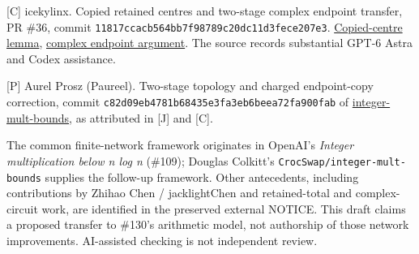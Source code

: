 \documentclass[
  11pt,
]{article}
\begin{document}
{[}C{]} icekylinx. Copied retained centres and two-stage complex
endpoint transfer, PR \#36, commit
\texttt{11817ccacb564bb7f98789c20dc11d3fece207e3}.
\href{https://github.com/icekylinx/integer-mult-bounds/blob/11817ccacb564bb7f98789c20dc11d3fece207e3/notes/copied-centers-lemma.tex}{Copied-centre
lemma},
\href{https://github.com/icekylinx/integer-mult-bounds/blob/11817ccacb564bb7f98789c20dc11d3fece207e3/notes/copied-centers-complex.tex}{complex
endpoint argument}. The source records substantial GPT-6 Astra and Codex
assistance.

{[}P{]} Aurel Prosz (Paureel). Two-stage topology and charged
endpoint-copy correction, commit
\texttt{c82d09eb4781b68435e3fa3eb6beea72fa900fab} of
\href{https://github.com/Paureel/integer-mult-bounds/tree/c82d09eb4781b68435e3fa3eb6beea72fa900fab}{integer-mult-bounds},
as attributed in {[}J{]} and {[}C{]}.

The common finite-network framework originates in OpenAI's \emph{Integer
multiplication below n log n} (\#109); Douglas Colkitt's
\texttt{CrocSwap/integer-mult-bounds} supplies the follow-up framework.
Other antecedents, including contributions by Zhihao Chen /
jacklightChen and retained-total and complex-circuit work, are
identified in the preserved external NOTICE. This draft claims a
proposed transfer to \#130's arithmetic model, not authorship of those
network improvements. AI-assisted checking is not independent review.
\end{document}
